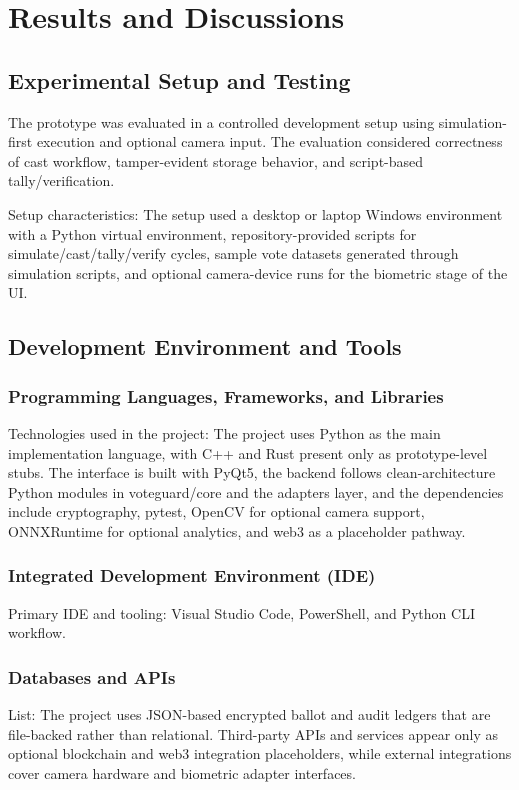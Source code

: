 \chapter{Results and Discussions}

\section{Experimental Setup and Testing}
The prototype was evaluated in a controlled development setup using simulation-first execution and optional camera input. The evaluation considered correctness of cast workflow, tamper-evident storage behavior, and script-based tally/verification.

Setup characteristics:
The setup used a desktop or laptop Windows environment with a Python virtual environment, repository-provided scripts for simulate/cast/tally/verify cycles, sample vote datasets generated through simulation scripts, and optional camera-device runs for the biometric stage of the UI.

\section{Development Environment and Tools}

\subsection{Programming Languages, Frameworks, and Libraries}
Technologies used in the project:
The project uses Python as the main implementation language, with C++ and Rust present only as prototype-level stubs. The interface is built with PyQt5, the backend follows clean-architecture Python modules in voteguard/core and the adapters layer, and the dependencies include cryptography, pytest, OpenCV for optional camera support, ONNXRuntime for optional analytics, and web3 as a placeholder pathway.

\subsection{Integrated Development Environment (IDE)}
Primary IDE and tooling: Visual Studio Code, PowerShell, and Python CLI workflow.

\subsection{Databases and APIs}
List:
The project uses JSON-based encrypted ballot and audit ledgers that are file-backed rather than relational. Third-party APIs and services appear only as optional blockchain and web3 integration placeholders, while external integrations cover camera hardware and biometric adapter interfaces.

